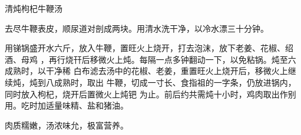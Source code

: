 \begin{recipe}{清炖枸杞牛鞭汤}

\ingredients



\preparation

去尽牛鞭表皮，顺尿道对剖成两块。用清水洗干净，以冷水漂三十分钟。

用锑锅盛开水六斤，放入牛鞭，置旺火上烧开，打去泡沫，放下老姜、花椒、绍酒、母鸡
，再行烧幵后移微火上炖。每隔一点多钟翻动一下，以免粘锅。炖至六成熟时，以干净稀
白布滤去汤中的花椒、老姜，重置旺火上烧开后，移微火上继续炖，炖到八成熟时，取出
牛鞭，切成一寸长、食指祖的一字条，仍放进锅内，同时放入枸杞，烧开后置微火上炖钯
为止。前后约共需炖十小时，鸡肉取出作别用。吃时加适量味精、盐和猪油。

\features

肉质糯嫩，汤浓味允，极富营养。

\end{recipe}

